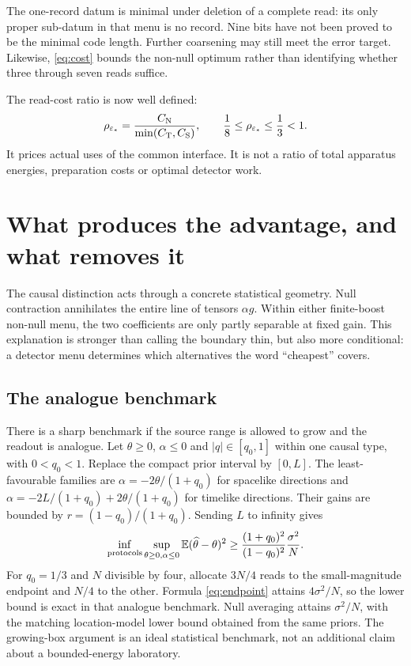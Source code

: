\documentclass[12pt,a4paper]{article}
\theoremstyle{definition}
\newcommand{\E}{\mathbb E}
\begin{document}
The one-record datum is minimal under deletion of a complete read: its
only proper sub-datum in that menu is no record. Nine bits have not been
proved to be the minimal code length. Further coarsening may still meet
the error target. Likewise, \eqref{eq:cost} bounds the non-null optimum
rather than identifying whether three through seven reads suffice.

The read-cost ratio is now well defined:
\begin{equation}
 \rho_{\varepsilon_*}
 =\frac{C_{\rm N}}{\min(C_{\rm T},C_{\rm S})},
 \qquad \frac18\leq\rho_{\varepsilon_*}\leq\frac13<1.
\end{equation}
It prices actual uses of the common interface. It is not a ratio of
total apparatus energies, preparation costs or optimal detector work.

\section{What produces the advantage, and what removes it}
\label{sec:boundaries}

The causal distinction acts through a concrete statistical geometry.
Null contraction annihilates the entire line of tensors $\alpha g$.
Within either finite-boost non-null menu, the two coefficients are only
partly separable at fixed gain. This explanation is stronger than calling
the boundary thin, but also more conditional: a detector menu determines
which alternatives the word ``cheapest'' covers.

\subsection{The analogue benchmark}

There is a sharp benchmark if the source range is allowed to grow and the
readout is analogue. Let $\theta\geq0$, $\alpha\leq0$ and
$|q|\in[q_0,1]$ within one causal type, with $0<q_0<1$. Replace the
compact prior interval by $[0,L]$. The least-favourable families are
$\alpha=-2\theta/(1+q_0)$ for spacelike directions and
$\alpha=-2L/(1+q_0)+2\theta/(1+q_0)$ for timelike directions. Their gains
are bounded by $r=(1-q_0)/(1+q_0)$. Sending $L$ to infinity gives
\begin{equation}
 \inf_{\rm protocols}\sup_{\theta\geq0,\alpha\leq0}
 \E(\widehat\theta-\theta)^2
 \geq\frac{(1+q_0)^2}{(1-q_0)^2}\frac{\sigma^2}{N}.
 \label{eq:ideal}
\end{equation}
For $q_0=1/3$ and $N$ divisible by four, allocate $3N/4$ reads to the
small-magnitude endpoint and $N/4$ to the other. Formula
\eqref{eq:endpoint} attains $4\sigma^2/N$, so the lower bound is exact
in that analogue benchmark. Null averaging attains $\sigma^2/N$, with
the matching location-model lower bound obtained from the same priors.
The growing-box argument is an ideal statistical benchmark, not an
additional claim about a bounded-energy laboratory.
\end{document}
